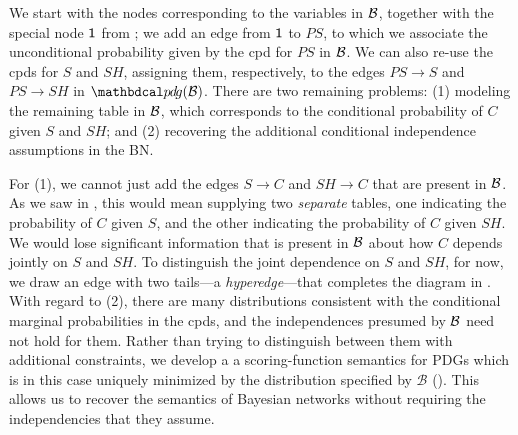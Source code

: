 \documentclass[the-pdg-manual.tex]{subfiles}
\begin{document}
\begin{example}[emulating a BN]
We start with the nodes corresponding to the variables in $\cal B$, together
with the special node $\sf 1$ from ; we add an edge
from ${\sf 1}$ to $\mathit{PS}$, to which we associate the unconditional
probability given by the cpd for $\mathit{PS}$ in $\cal B$. We can also re-use
the cpds for $S$ and $\mathit{SH}$, assigning them, respectively, to the edges
$PS \to S$ and $PS \to SH$ in $\PDGof{{\mathcal B}}$.
There are two remaining problems: (1) modeling the remaining table in $\cal B$,
which corresponds to the conditional probability of $C$ given $S$ and $SH$; and
(2) recovering the additional
conditional
independence assumptions in the BN. 

For (1), we cannot just add the edges $S \to C$ and $SH \to C$ that are present
in $\cal B$. As we saw in , this would mean
supplying two \emph{separate} tables, one indicating the probability of $C$
given $S$, and the other indicating the probability of $C$ given
$\mathit{SH}$.  We would lose significant information that is
present in $\cal B$  about 
how $C$ depends jointly on $S$ and $SH$. To distinguish the joint dependence on
$S$ and $\mathit{SH}$, for now, we draw an edge with two tails---a
\emph{hyperedge}---that completes the diagram in . 
%
With regard to (2), there are many distributions consistent with the conditional
marginal probabilities in the cpds, and the independences presumed by $\cal B$
need not hold for them. 
Rather than trying to distinguish between them with additional constraints,
we develop a a scoring-function semantics for PDGs
which 
is in this case uniquely minimized by the distribution 
%
specified by ${\mathcal B}$ ().
This allows us to recover the semantics of Bayesian networks without requiring the independencies that they assume.


\end{example}
\end{document}
